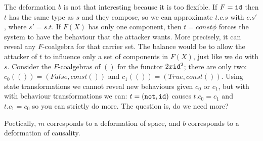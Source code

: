 {\color{red}The deformation $b$ is not that interesting because it is too flexible. If $F={\texttt{id}}$ then $t$ has the same type as $s$ and they compose, so we can approximate $t.c.s$ with $c.s'$, where $s'=s.t$. If $F(X)$ has only one component, then $t=const \phi$ forces the system to have the behaviour that the attacker wants. More precisely, it can reveal any $F$-coalgebra for that carrier set. The balance would be to allow the attacker of $t$ to influence only a set of components in $F(X)$, just like we do with $s$. Consider the $F$-coalgebras of $()$ for the functor $2x{\texttt{id}}^2$; there are only two: $c_0(())=(False,const ())$ and $c_1(())=(True,const ())$. Using state transformations we cannot reveal new behaviours given $c_0$ or $c_1$, but with with behaviour transformations we can: $t=(\texttt{not},{\texttt{id}})$ causes $t.c_0=c_1$ and $t.c_1=c_0$ so you can strictly do more. The question is, do we need more? 

Poetically, $m$ corresponds to a deformation of space, and $b$ corresponds to a deformation of causality.
}

